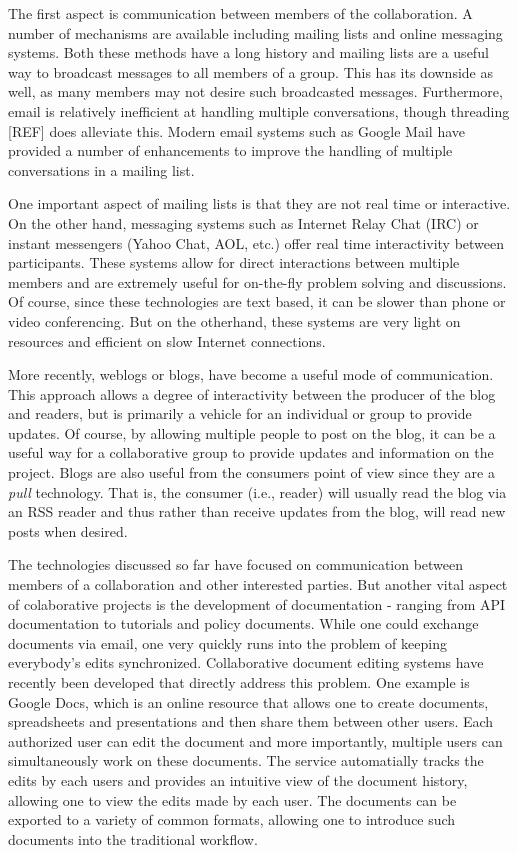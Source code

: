 \documentclass[12pt]{book}
\begin{document}
The first aspect is communication between members of the
collaboration. A number of mechanisms are available including mailing
lists and online messaging systems. Both these methods have a long
history and mailing lists are a useful way to broadcast messages to
all members of a group. This has its downside as well, as many members
may not desire such broadcasted messages. Furthermore, email is
relatively inefficient at handling multiple conversations, though
threading [REF] does alleviate this. Modern email systems such as
Google Mail have provided a number of enhancements to improve the
handling of multiple conversations in a mailing list. 

One important aspect of mailing lists is that they are not real time
or interactive. On the other hand, messaging systems such as Internet
Relay Chat (IRC) or instant messengers (Yahoo Chat, AOL, etc.) offer
real time interactivity between participants. These systems allow for
direct interactions between multiple members and are extremely useful
for on-the-fly problem solving and discussions. Of course, since these
technologies are text based, it can be slower than phone or video
conferencing. But on the otherhand, these systems are very light on
resources and efficient on slow Internet connections.

More recently, weblogs or blogs, have become a useful mode of
communication. This approach allows a degree of interactivity between
the producer of the blog and readers, but is primarily a vehicle for
an individual or group to provide updates. Of course, by allowing
multiple people to post on the blog, it can be a useful way for a
collaborative group to provide updates and information on the
project. Blogs are also useful from the consumers point of view since
they are a \emph{pull} technology. That is, the consumer (i.e.,
reader) will usually read the blog via an RSS reader and thus rather
than receive updates from the blog, will read new posts when desired.

The technologies discussed so far have focused on communication
between members of a collaboration and other interested parties. But
another vital aspect of colaborative projects is the development of
documentation - ranging from API documentation to tutorials and policy
documents. While one could exchange documents via email, one very
quickly runs into the problem of keeping everybody's edits
synchronized. Collaborative document editing systems have recently
been developed that directly address this problem. One example is
Google Docs, which is an online resource that allows one to create
documents, spreadsheets and presentations and then share them between
other users. Each authorized user can edit the document and more
importantly, multiple users can simultaneously work on these
documents. The service automatially tracks the edits by each users and
provides an intuitive view of the document history, allowing one to
view the edits made by each user. The documents can be exported to a
variety of common formats, allowing one to introduce such documents
into the traditional workflow.
\end{document}
